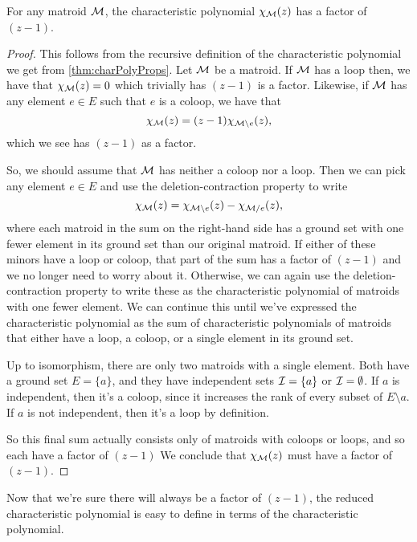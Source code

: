 \documentclass[12pt,oneside]{../../sfsuthesis}
\begin{document}
\begin{proposition}\th\label{thm:charPolyFactor}
    For any matroid \( \mathcal{M} \), the characteristic polynomial \( \chi_{\mathcal{M}}(z) \) has a factor of \( (z - 1) \).
\end{proposition}
\begin{proof}
    This follows from the recursive definition of the characteristic polynomial we get from \th\ref{thm:charPolyProps}.
    Let \( \mathcal{M} \) be a matroid.
    If \( \mathcal{M} \) has a loop then, we have that \( \chi_{\mathcal{M}}(z) = 0 \) which trivially has \( (z - 1) \) is a factor.
    Likewise, if \( \mathcal{M} \) has any element \( e \in E \) such that \( e \) is a coloop, we have that
    \[
        \chi_{\mathcal{M}}(z) = (z - 1)\chi_{\mathcal{M} \setminus e}(z),
    \]
    which we see has \( (z - 1) \) as a factor.

    So, we should assume that \( \mathcal{M} \) has neither a coloop nor a loop.
    Then we can pick any element \( e \in E \) and use the deletion-contraction property to write
    \[
        \chi_{\mathcal{M}}(z) = \chi_{\mathcal{M} \setminus e}(z) - \chi_{\mathcal{M} / e}(z),
    \]
    where each matroid in the sum on the right-hand side has a ground set with one fewer element in its ground set than our original matroid.
    If either of these minors have a loop or coloop, that part of the sum has a factor of \( (z - 1) \) and we no longer need to worry about it.
    Otherwise, we can again use the deletion-contraction property to write these as the characteristic polynomial of matroids with one fewer element.
    We can continue this until we've expressed the characteristic polynomial as the sum of characteristic polynomials of matroids that either have a loop, a coloop, or a single element in its ground set.

    Up to isomorphism, there are only two matroids with a single element.
    Both have a ground set \( E = \{a\} \), and they have independent sets \( \mathcal{I} = \{a\} \) or \( \mathcal{I} = \emptyset \).
    If \( a \) is independent, then it's a coloop, since it increases the rank of every subset of \( E \setminus a \).
    If \( a \) is not independent, then it's a loop by definition.

    So this final sum actually consists only of matroids with coloops or loops, and so each have a factor of \( (z - 1) \)
    We conclude that \( \chi_{\mathcal{M}}(z) \) must have a factor of \( (z - 1) \).
\end{proof}
Now that we're sure there will always be a factor of \( (z - 1) \), the reduced characteristic polynomial is easy to define in terms of the characteristic polynomial.
\end{document}
